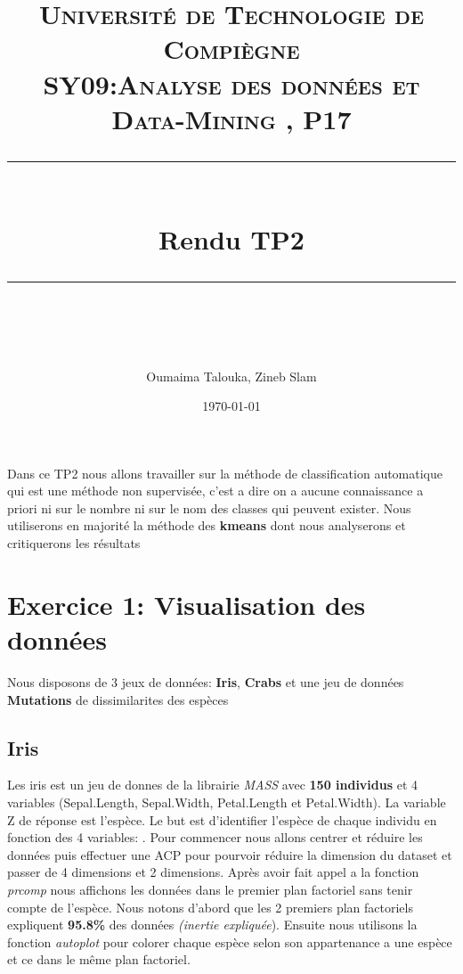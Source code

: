 \documentclass[10pt]{article}
\title{
	\normalfont \normalsize 
	\textsc{Université de Technologie de Compiègne\\ 
		SY09:Analyse des données et Data-Mining , P17} \\
	[10pt] 
	\rule{\linewidth}{0.5pt} \\[6pt] 
	\huge Rendu TP2\\
	\rule{\linewidth}{2pt}  \\[10pt]
}
\author{Oumaima Talouka, Zineb Slam}
\date{\normalsize \today}
\begin{document}
	{\let\newpage\relax\maketitle}	
	
		Dans ce TP2 nous allons travailler sur la méthode de classification automatique qui est une  méthode non supervisée, c'est a dire on a aucune connaissance a priori ni sur le nombre ni sur le nom des classes qui peuvent exister. Nous utiliserons en majorité la méthode des \textbf{kmeans} dont nous analyserons et critiquerons les résultats
	
	\section{ Exercice 1: Visualisation des données}
	Nous disposons de 3 jeux de données:  \textbf{Iris}, \textbf{Crabs} et une jeu de données \textbf{Mutations} de dissimilarites des espèces
	
	\subsection{Iris}
		Les iris est un jeu de donnes de la librairie \textit{MASS} avec \textbf{150 individus} et 4 variables (Sepal.Length, Sepal.Width, Petal.Length et Petal.Width).  La variable Z de réponse est l'espèce. Le but est d'identifier l'espèce de chaque individu en fonction des 4 variables: .	Pour commencer nous allons centrer et réduire les données puis effectuer une ACP pour pourvoir réduire la dimension du dataset et passer de 4 dimensions et 2 dimensions. Après avoir fait appel a la fonction \textit{prcomp} nous affichons les données dans le premier plan factoriel sans tenir compte de l'espèce. Nous notons d'abord que les 2 premiers plan factoriels expliquent \textbf{95.8\%} des données \textit{(inertie expliquée}).  Ensuite  nous utilisons la fonction \textit{autoplot} pour colorer chaque espèce selon son appartenance a une espèce et ce dans le même plan factoriel.
		
\end{document}
